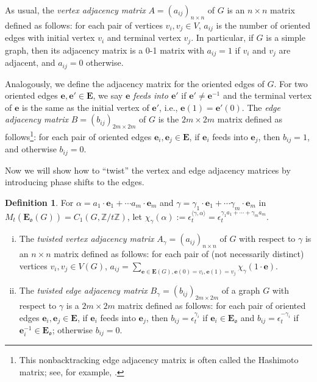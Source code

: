 \documentclass[11pt]{amsart}
\theoremstyle{plain}
\theoremstyle{definition}
\newtheorem{definition}[theorem]{Definition}
\newcommand{\mbbZ}{{\mathbb Z}}
\newcommand{\mfrako}{{\mathfrak o}}
\newcommand{\ve}{{\mathbf e}}
\newcommand{\vE}{{\mathbf E}}
\numberwithin{equation}{section}
\begin{document}
As usual, the \emph{vertex adjacency matrix} $A=(a_{ij})_{n\times n}$ of $G$ is an $n\times n$ matrix defined as follows: for each pair of vertices $v_i,v_j\in V$, $a_{ij}$ is the number of oriented edges with initial vertex $v_i$ and terminal vertex $v_j$. In particular, if $G$ is a simple graph, then its adjacency matrix is a 0-1 matrix with $a_{ij}=1$ if $v_i$ and $v_j$ are adjacent, and $a_{ij}=0$ otherwise. 

Analogously, we define the adjacency matrix for the oriented edges of $G$. For two oriented edges $\ve,\ve' \in\vE$, we say \emph{$\ve$ feeds into $\ve'$} if $\ve'\neq \ve^{-1}$ and the terminal vertex of $\ve$ is the same as the initial vertex of $\ve'$, i.e., $\ve(1)=\ve'(0)$. The \emph{edge adjacency matrix} $B=(b_{ij})_{2m\times 2m}$ of $G$ is the $2m\times 2m$ matrix defined as follows\footnote{This nonbacktracking edge adjacency matrix is often called the Hashimoto matrix; see, for example, \cite{T2011Zeta}.}: for each pair of oriented edges $\ve_i,\ve_j\in \vE$, if $\ve_i$ feeds into $\ve_j$, then $b_{ij}=1$, and otherwise $b_{ij}=0$. 

Now we will show how to ``twist'' the vertex and edge adjacency matrices by introducing phase shifts to the edges. 

\begin{definition} \label{D:twist}
 For $\alpha=a_1\cdot \ve_1+\cdots a_m\cdot \ve_m$ and $\gamma = \gamma_1\cdot \ve_1+\cdots \gamma_m\cdot \ve_m$ in $M_t(\vE_\mfrako(G))=C_1(G,\mbbZ/t\mbbZ)$, let $\chi_\gamma(\alpha):=\epsilon_t^{\langle\gamma,\alpha\rangle}=\epsilon_t^{\gamma_1a_1+\cdots+\gamma_ma_m}$. 

\begin{enumerate}[(i)]
\item The \emph{twisted vertex adjacency matrix} $A_\gamma=(a_{ij})_{n\times n}$ of  $G$ with respect to $\gamma$ is an $n\times n$ matrix defined as follows: 
 for each pair of (not necessarily distinct)  vertices $v_i,v_j\in V(G)$, $a_{ij}=\sum_{\ve\in \vE(G),\ve(0)=v_i,\ve(1)=v_j} \chi_\gamma(1\cdot \ve)$. 

\item The \emph{twisted edge adjacency matrix} $B_\gamma=(b_{ij})_{2m\times 2m}$ of  a graph $G$ with respect to $\gamma$ is a $2m\times 2m$ matrix defined as follows: for each pair of oriented edges $\ve_i,\ve_j\in \vE$, if $\ve_i$ feeds into $\ve_j$, then $b_{ij} = \epsilon_t^{\gamma_i}$ if $\ve_i\in \vE_\mfrako$ and $b_{ij} = \epsilon_t^{-\gamma_i}$ if $\ve_i^{-1}\in \vE_\mfrako$; otherwise $b_{ij}=0$.
\end{enumerate}

\end{definition}
\end{document}
